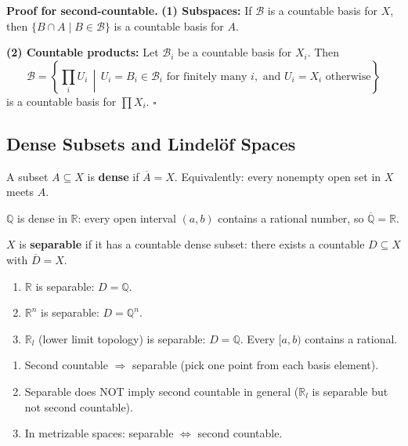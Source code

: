 \documentclass[11pt]{report}
\renewenvironment{proof}[1][Proof]{\noindent\textbf{#1.} }{\hfill$\square$\par\vspace{5pt}}
\begin{document}
\begin{proof}[Proof for second-countable]
\textbf{(1) Subspaces:} If $\mathcal{B}$ is a countable basis for $X$, then $\{B \cap A \mid B \in \mathcal{B}\}$ is a countable basis for $A$.

\textbf{(2) Countable products:} Let $\mathcal{B}_i$ be a countable basis for $X_i$. Then
\[\mathcal{B} = \left\{\prod_{i} U_i \,\middle|\, U_i = B_i \in \mathcal{B}_i \text{ for finitely many } i, \text{ and } U_i = X_i \text{ otherwise}\right\}\]
is a countable basis for $\prod X_i$.
\end{proof}

\subsection{Dense Subsets and Lindelöf Spaces}

\begin{defbox}[Dense]
A subset $A \subseteq X$ is \textbf{dense} if $\overline{A} = X$. Equivalently: every nonempty open set in $X$ meets $A$.
\end{defbox}

\begin{exbox}
$\mathbb{Q}$ is dense in $\mathbb{R}$: every open interval $(a, b)$ contains a rational number, so $\overline{\mathbb{Q}} = \mathbb{R}$.
\end{exbox}

\begin{defbox}[Separable]
$X$ is \textbf{separable} if it has a countable dense subset: there exists a countable $D \subseteq X$ with $\overline{D} = X$.
\end{defbox}

\begin{exbox}
\begin{enumerate}[nosep]
    \item $\mathbb{R}$ is separable: $D = \mathbb{Q}$.
    \item $\mathbb{R}^n$ is separable: $D = \mathbb{Q}^n$.
    \item $\mathbb{R}_l$ (lower limit topology) is separable: $D = \mathbb{Q}$. Every $[a, b)$ contains a rational.
\end{enumerate}
\end{exbox}

\begin{propbox}
\begin{enumerate}[nosep]
    \item Second countable $\Rightarrow$ separable (pick one point from each basis element).
    \item Separable does NOT imply second countable in general ($\mathbb{R}_l$ is separable but not second countable).
    \item In metrizable spaces: separable $\iff$ second countable.
\end{enumerate}
\end{propbox}
\end{document}
